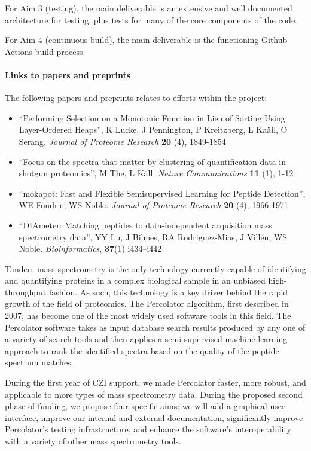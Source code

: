 \documentclass{article}
\begin{document}
For Aim 3 (testing), the main deliverable is an extensive and well
documented architecture for testing, plus tests for many of the core
components of the code.

For Aim 4 (continuous build), the main deliverable is the functioning
Github Actions build process.

\paragraph{Links to papers and preprints}
The following papers and preprints relates to efforts within the project:

\begin{itemize}
  \item ``Performing Selection on a Monotonic Function in Lieu of Sorting Using Layer-Ordered Heaps'',
  K Lucke, J Pennington, P Kreitzberg, L Ka\"{a}ll, O Serang.
  {\em Journal of Proteome Research} {\bf 20} (4), 1849-1854
  \item ``Focus on the spectra that matter by clustering of quantification data in shotgun proteomics'',
  M The, L K\"{a}ll.
  {\em Nature Communications} {\bf 11} (1), 1-12
  \item ``mokapot: Fast and Flexible Semisupervised Learning for Peptide Detection'',
  WE Fondrie, WS Noble.
  {\em Journal of Proteome Research} {\bf 20} (4), 1966-1971
  \item ``DIAmeter: Matching peptides to data-independent acquisition mass spectrometry data'',
  YY Lu, J Bilmes, RA Rodriguez-Mias, J Vill\'en, WS Noble. {\em Bioinformatics}, {\bf 37}(1) i434–i442
\end{itemize}


Tandem mass spectrometry is the only technology currently capable of
identifying and quantifying proteins in a complex biological sample in
an unbiased high-throughput fashion. As such, this technology is a key
driver behind the rapid growth of the field of proteomics. The
Percolator algorithm, first described in 2007, has become one of the
most widely used software tools in this field. The Percolator software
takes as input database search results produced by any one of a
variety of search tools and then applies a semi-supervised machine
learning approach to rank the identified spectra based on the quality
of the peptide-spectrum matches.

During the first year of CZI support, we made Percolator faster, more
robust, and applicable to more types of mass spectrometry data. During
the proposed second phase of funding, we propose four specific aims:
we will add a graphical user interface, improve our internal and
external documentation, significantly improve Percolator's testing
infrastructure, and enhance the software's interoperability with a
variety of other mass spectrometry tools.
\end{document}
